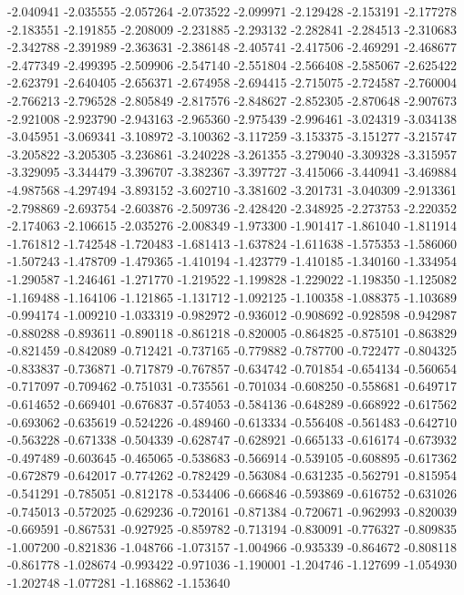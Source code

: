 -2.040941
-2.035555
-2.057264
-2.073522
-2.099971
-2.129428
-2.153191
-2.177278
-2.183551
-2.191855
-2.208009
-2.231885
-2.293132
-2.282841
-2.284513
-2.310683
-2.342788
-2.391989
-2.363631
-2.386148
-2.405741
-2.417506
-2.469291
-2.468677
-2.477349
-2.499395
-2.509906
-2.547140
-2.551804
-2.566408
-2.585067
-2.625422
-2.623791
-2.640405
-2.656371
-2.674958
-2.694415
-2.715075
-2.724587
-2.760004
-2.766213
-2.796528
-2.805849
-2.817576
-2.848627
-2.852305
-2.870648
-2.907673
-2.921008
-2.923790
-2.943163
-2.965360
-2.975439
-2.996461
-3.024319
-3.034138
-3.045951
-3.069341
-3.108972
-3.100362
-3.117259
-3.153375
-3.151277
-3.215747
-3.205822
-3.205305
-3.236861
-3.240228
-3.261355
-3.279040
-3.309328
-3.315957
-3.329095
-3.344479
-3.396707
-3.382367
-3.397727
-3.415066
-3.440941
-3.469884
-4.987568
-4.297494
-3.893152
-3.602710
-3.381602
-3.201731
-3.040309
-2.913361
-2.798869
-2.693754
-2.603876
-2.509736
-2.428420
-2.348925
-2.273753
-2.220352
-2.174063
-2.106615
-2.035276
-2.008349
-1.973300
-1.901417
-1.861040
-1.811914
-1.761812
-1.742548
-1.720483
-1.681413
-1.637824
-1.611638
-1.575353
-1.586060
-1.507243
-1.478709
-1.479365
-1.410194
-1.423779
-1.410185
-1.340160
-1.334954
-1.290587
-1.246461
-1.271770
-1.219522
-1.199828
-1.229022
-1.198350
-1.125082
-1.169488
-1.164106
-1.121865
-1.131712
-1.092125
-1.100358
-1.088375
-1.103689
-0.994174
-1.009210
-1.033319
-0.982972
-0.936012
-0.908692
-0.928598
-0.942987
-0.880288
-0.893611
-0.890118
-0.861218
-0.820005
-0.864825
-0.875101
-0.863829
-0.821459
-0.842089
-0.712421
-0.737165
-0.779882
-0.787700
-0.722477
-0.804325
-0.833837
-0.736871
-0.717879
-0.767857
-0.634742
-0.701854
-0.654134
-0.560654
-0.717097
-0.709462
-0.751031
-0.735561
-0.701034
-0.608250
-0.558681
-0.649717
-0.614652
-0.669401
-0.676837
-0.574053
-0.584136
-0.648289
-0.668922
-0.617562
-0.693062
-0.635619
-0.524226
-0.489460
-0.613334
-0.556408
-0.561483
-0.642710
-0.563228
-0.671338
-0.504339
-0.628747
-0.628921
-0.665133
-0.616174
-0.673932
-0.497489
-0.603645
-0.465065
-0.538683
-0.566914
-0.539105
-0.608895
-0.617362
-0.672879
-0.642017
-0.774262
-0.782429
-0.563084
-0.631235
-0.562791
-0.815954
-0.541291
-0.785051
-0.812178
-0.534406
-0.666846
-0.593869
-0.616752
-0.631026
-0.745013
-0.572025
-0.629236
-0.720161
-0.871384
-0.720671
-0.962993
-0.820039
-0.669591
-0.867531
-0.927925
-0.859782
-0.713194
-0.830091
-0.776327
-0.809835
-1.007200
-0.821836
-1.048766
-1.073157
-1.004966
-0.935339
-0.864672
-0.808118
-0.861778
-1.028674
-0.993422
-0.971036
-1.190001
-1.204746
-1.127699
-1.054930
-1.202748
-1.077281
-1.168862
-1.153640
